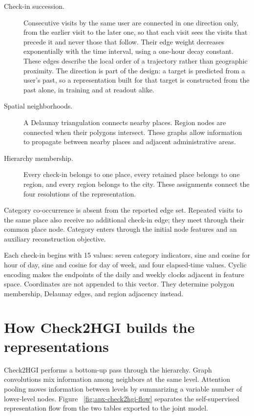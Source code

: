 \begin{description}
    \item[Check-in succession.] Consecutive visits by the same user are connected
    in one direction only, from the earlier visit to the later one, so that each
    visit sees the visits that precede it and never those that follow. Their edge
    weight decreases exponentially with the time
    interval, using a one-hour decay constant. These edges describe the local order
    of a trajectory rather than geographic proximity. The direction is part of the
    design: a target is predicted from a user's past, so a representation built for
    that target is constructed from the past alone, in training and at readout
    alike.

    \item[Spatial neighborhoods.] A Delaunay triangulation connects nearby places.
    Region nodes are connected when their polygons intersect. These graphs allow
    information to propagate between nearby places and adjacent administrative
    areas.

    \item[Hierarchy membership.] Every check-in belongs to one place, every
    retained place belongs to one region, and every region belongs to the city.
    These assignments connect the four resolutions of the representation.
\end{description}

Category co-occurrence is absent from the reported edge set. Repeated visits to the
same place also receive no additional check-in edge; they meet through their common
place node. Category enters through the initial node features and an auxiliary
reconstruction objective.

Each check-in begins with 15 values: seven category indicators, sine and cosine for
hour of day, sine and cosine for day of week, and four elapsed-time values. Cyclic encoding makes the endpoints
of the daily and weekly clocks adjacent in feature space. Coordinates are not
appended to this vector. They determine polygon membership, Delaunay edges, and
region adjacency instead.

\section{How Check2HGI builds the representations}
\label{sec:apx-check2hgi-forward}

Check2HGI performs a bottom-up pass through the hierarchy. Graph convolutions mix
information among neighbors at the same level. Attention pooling moves information
between levels by summarizing a variable number of lower-level nodes. Figure~
\ref{fig:apx-check2hgi-flow} separates the self-supervised representation flow from
the two tables exported to the joint model.

